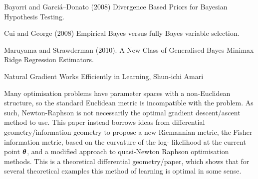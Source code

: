 \documentclass{amsart}[12pt]
\begin{document}
Bayorri and Garci\'{a}--Donato (2008) Divergence Based Priors for Bayesian Hypothesis Testing.

Cui and George (2008) Empirical Bayes versus fully Bayes variable selection.

Maruyama and Strawderman (2010). A New Class of Generalised Bayes Minimax Ridge Regression Estimators.

Natural Gradient Works Efficiently in Learning, Shun-ichi Amari

Many optimisation problems have parameter spaces with a non-Euclidean structure, so the standard Euclidean
metric is incompatible with the problem. As such, Newton-Raphson is not necessarily the optimal gradient
descent/ascent method to use. This paper instead borrows ideas from differential geometry/information geometry
to propose a new Riemannian metric, the Fisher information metric, based on the curvature of the log-
likelihood at the current point ${\boldsymbol \theta}$, and a modified approach to quasi-Newton Raphson optimisation
methods. This is a theoretical differential geometry/paper, which shows that for several theoretical examples
this method of learning is optimal in some sense.
\end{document}

